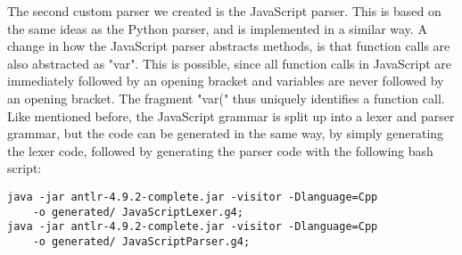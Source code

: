 \documentclass[../Main.tex]{subfiles}
\begin{document}
The second custom parser we created is the JavaScript parser. This is based on the same ideas as the Python parser, and is implemented in a similar way. A change in how the JavaScript parser abstracts methods, is that function calls are also abstracted as "var". This is possible, since all function calls in JavaScript are immediately followed by an opening bracket and variables are never followed by an opening bracket. The fragment "var(" thus uniquely identifies a function call. Like mentioned before, the JavaScript grammar is split up into a lexer and parser grammar, but the code can be generated in the same way, by simply generating the lexer code, followed by generating the parser code with the following bash script:
\begin{lstlisting}
java -jar antlr-4.9.2-complete.jar -visitor -Dlanguage=Cpp 
    -o generated/ JavaScriptLexer.g4;
java -jar antlr-4.9.2-complete.jar -visitor -Dlanguage=Cpp 
    -o generated/ JavaScriptParser.g4;
\end{lstlisting}
\end{document}
